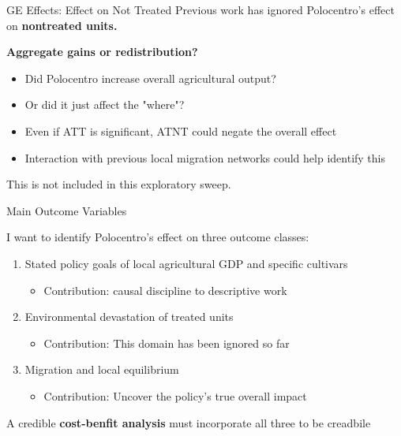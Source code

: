 \documentclass[aspectratio=169]{beamer}
\begin{document}
\begin{frame}{GE Effects: Effect on Not Treated}
Previous work has ignored Polocentro's effect on \textbf{nontreated units.}
\vspace{1em}

\textbf{Aggregate gains or redistribution?}
\begin{itemize}
    \item Did Polocentro increase overall agricultural output?
    \item Or did it just affect the "where"?
    \item Even if ATT is significant, ATNT could negate the overall effect
    \item Interaction with previous local migration networks could help identify this
\end{itemize}
\vspace{1em}
This is not included in this exploratory sweep.

\end{frame}

\begin{frame}{Main Outcome Variables}

I want to identify Polocentro's effect on three outcome classes:
\vspace{1em}

\begin{enumerate}
    \item Stated policy goals of local agricultural GDP and specific cultivars
    \begin{itemize}
        \item Contribution: causal discipline to descriptive work
    \end{itemize}
    \vspace{1em}
    \item Environmental devastation of treated units
    \begin{itemize}
        \item Contribution: This domain has been ignored so far
    \end{itemize}
    \vspace{1em}
    \item Migration and local equilibrium
    \begin{itemize}
        \item Contribution: Uncover the policy's true overall impact
    \end{itemize}
\end{enumerate}

\vspace{1em}

A credible \textbf{cost-benfit analysis} must incorporate all three to be creadbile
\end{frame}
\end{document}
